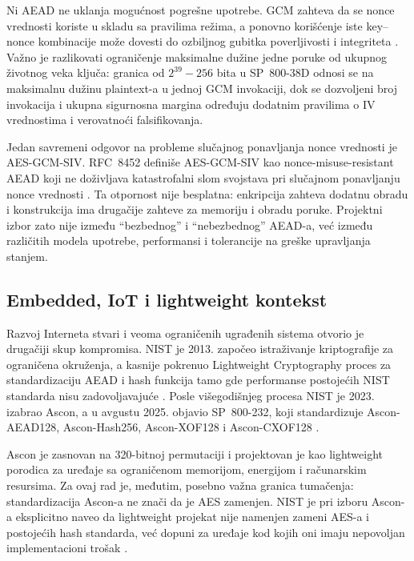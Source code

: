 Ni AEAD ne uklanja mogućnost pogrešne upotrebe. GCM zahteva da se nonce
vrednosti koriste u skladu sa pravilima režima, a ponovno korišćenje
iste key--nonce kombinacije može dovesti do ozbiljnog gubitka
poverljivosti i integriteta \cite{Dworkin2007GCM}. Važno je razlikovati
ograničenje maksimalne dužine jedne poruke od ukupnog životnog veka
ključa: granica od $2^{39}-256$ bita u SP~800-38D odnosi se na maksimalnu
dužinu plaintext-a u jednoj GCM invokaciji, dok se dozvoljeni broj
invokacija i ukupna sigurnosna margina određuju dodatnim pravilima o IV
vrednostima i verovatnoći falsifikovanja.

Jedan savremeni odgovor na probleme slučajnog ponavljanja nonce vrednosti
je AES-GCM-SIV. RFC~8452 definiše AES-GCM-SIV kao nonce-misuse-resistant
AEAD koji ne doživljava katastrofalni slom svojstava pri slučajnom
ponavljanju nonce vrednosti \cite{RFC8452}. Ta otpornost nije besplatna:
enkripcija zahteva dodatnu obradu i konstrukcija ima drugačije zahteve
za memoriju i obradu poruke. Projektni izbor zato nije između
``bezbednog'' i ``nebezbednog'' AEAD-a, već između različitih modela
upotrebe, performansi i tolerancije na greške upravljanja stanjem.


\subsection{Embedded, IoT i lightweight kontekst}

Razvoj Interneta stvari i veoma ograničenih ugrađenih sistema otvorio je
drugačiji skup kompromisa. NIST je 2013. započeo istraživanje kriptografije
za ograničena okruženja, a kasnije pokrenuo Lightweight Cryptography
proces za standardizaciju AEAD i hash funkcija tamo gde performanse
postojećih NIST standarda nisu zadovoljavajuće
\cite{NISTLightweightProject}. Posle višegodišnjeg procesa NIST je 2023.
izabrao Ascon, a u avgustu 2025. objavio SP~800-232, koji standardizuje
Ascon-AEAD128, Ascon-Hash256, Ascon-XOF128 i Ascon-CXOF128
\cite{NISTSP800232}.

Ascon je zasnovan na 320-bitnoj permutaciji i projektovan je kao
lightweight porodica za uređaje sa ograničenom memorijom, energijom i
računarskim resursima. Za ovaj rad je, međutim, posebno važna granica
tumačenja: standardizacija Ascon-a ne znači da je AES zamenjen.
NIST je pri izboru Ascon-a eksplicitno naveo da lightweight projekat nije
namenjen zameni AES-a i postojećih hash standarda, već dopuni za uređaje
kod kojih oni imaju nepovoljan implementacioni trošak
\cite{NISTAsconSelection2023}.

